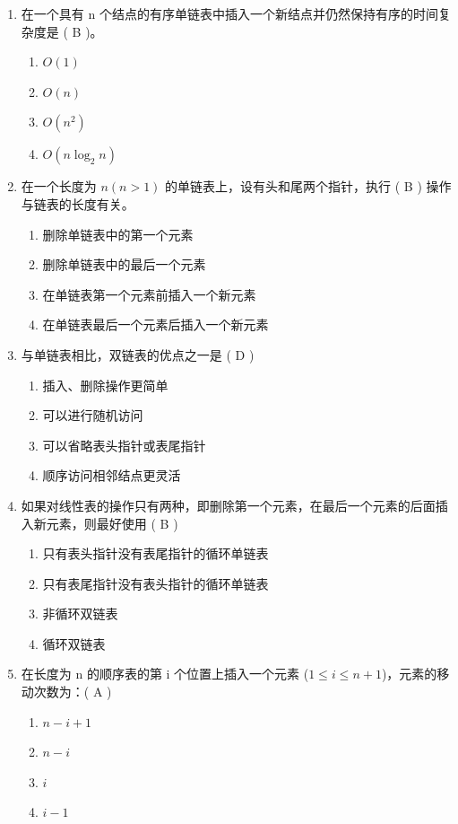 \documentclass[12pt, a4paper]{article}
\begin{document}
\begin{enumerate}[label=\arabic*.]
    \item 在一个具有 n 个结点的有序单链表中插入一个新结点并仍然保持有序的时间复杂度是 ( B )。
    \begin{enumerate}
        \item $O(1)$
        \item $O(n)$
        \item $O(n^2)$
        \item $O(n \log_2 n)$
    \end{enumerate}

    \item 在一个长度为 $n (n>1)$ 的单链表上，设有头和尾两个指针，执行 ( B ) 操作与链表的长度有关。
    \begin{enumerate}
        \item 删除单链表中的第一个元素
        \item 删除单链表中的最后一个元素
        \item 在单链表第一个元素前插入一个新元素
        \item 在单链表最后一个元素后插入一个新元素
    \end{enumerate}

    \item 与单链表相比，双链表的优点之一是 ( D )
    \begin{enumerate}
        \item 插入、删除操作更简单
        \item 可以进行随机访问
        \item 可以省略表头指针或表尾指针
        \item 顺序访问相邻结点更灵活
    \end{enumerate}

    \item 如果对线性表的操作只有两种，即删除第一个元素，在最后一个元素的后面插入新元素，则最好使用 ( B )
    \begin{enumerate}
        \item 只有表头指针没有表尾指针的循环单链表
        \item 只有表尾指针没有表头指针的循环单链表
        \item 非循环双链表
        \item 循环双链表
    \end{enumerate}

    \item 在长度为 n 的顺序表的第 i 个位置上插入一个元素 ($1 \le i \le n+1$)，元素的移动次数为：( A )
    \begin{enumerate}
        \item $n-i+1$
        \item $n-i$
        \item $i$
        \item $i-1$
    \end{enumerate}


\end{enumerate}
\end{document}

